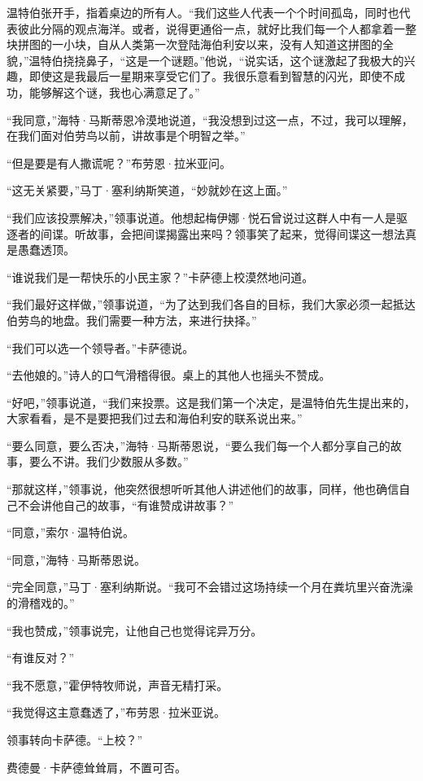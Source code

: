 \documentclass[AutoFakeBold=true]{book}
\begin{document}
温特伯张开手，指着桌边的所有人。``我们这些人代表一个个时间孤岛，同时也代表彼此分隔的观点海洋。或者，说得更通俗一点，就好比我们每一个人都拿着一整块拼图的一小块，自从人类第一次登陆海伯利安以来，没有人知道这拼图的全貌，''温特伯挠挠鼻子，``这是一个谜题。''他说，``说实话，这个谜激起了我极大的兴趣，即使这是我最后一星期来享受它们了。我很乐意看到智慧的闪光，即使不成功，能够解这个谜，我也心满意足了。''

``我同意，''海特·马斯蒂恩冷漠地说道，``我没想到过这一点，不过，我可以理解，在我们面对伯劳鸟以前，讲故事是个明智之举。''

``但是要是有人撒谎呢？''布劳恩·拉米亚问。

``这无关紧要，''马丁·塞利纳斯笑道，``妙就妙在这上面。''

``我们应该投票解决，''领事说道。他想起梅伊娜·悦石曾说过这群人中有一人是驱逐者的间谍。听故事，会把间谍揭露出来吗？领事笑了起来，觉得间谍这一想法真是愚蠢透顶。

``谁说我们是一帮快乐的小民主家？''卡萨德上校漠然地问道。

``我们最好这样做，''领事说道，``为了达到我们各自的目标，我们大家必须一起抵达伯劳鸟的地盘。我们需要一种方法，来进行抉择。''

``我们可以选一个领导者。''卡萨德说。

``去他娘的。''诗人的口气滑稽得很。桌上的其他人也摇头不赞成。

``好吧，''领事说道，``我们来投票。这是我们第一个决定，是温特伯先生提出来的，大家看看，是不是要把我们过去和海伯利安的联系说出来。''

``要么同意，要么否决，''海特·马斯蒂恩说，``要么我们每一个人都分享自己的故事，要么不讲。我们少数服从多数。''

``那就这样，''领事说，他突然很想听听其他人讲述他们的故事，同样，他也确信自己不会讲他自己的故事，``有谁赞成讲故事？''

``同意，''索尔·温特伯说。

``同意，''海特·马斯蒂恩说。

``完全同意，''马丁·塞利纳斯说。``我可不会错过这场持续一个月在粪坑里兴奋洗澡的滑稽戏的。''

``我也赞成，''领事说完，让他自己也觉得诧异万分。

``有谁反对？''

``我不愿意，''霍伊特牧师说，声音无精打采。

``我觉得这主意蠢透了，''布劳恩·拉米亚说。

领事转向卡萨德。``上校？''

费德曼·卡萨德耸耸肩，不置可否。
\end{document}

